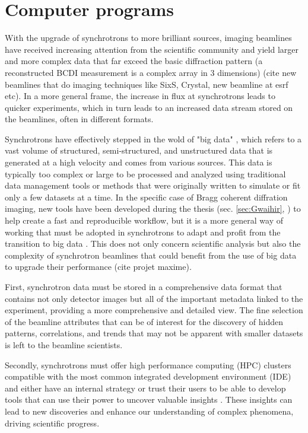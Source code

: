 \newpage
\section{Computer programs}

With the upgrade of synchrotrons to more brilliant sources, imaging beamlines have received increasing attention from the scientific community and yield larger and more complex data that far exceed the basic diffraction pattern (a reconstructed BCDI measurement is a complex array in 3 dimensions) (cite new beamlines that do imaging techniques like SixS, Crystal, new beamline at esrf etc).
In a more general frame, the increase in flux at synchrotrons leads to quicker experiments, which in turn leads to an increased data stream stored on the beamlines, often in different formats.

Synchrotrons have effectively stepped in the wold of "big data" \parencite{Alizada2017, Wang2018}, which refers to a vast volume of structured, semi-structured, and unstructured data that is generated at a high velocity and comes from various sources.
This data is typically too complex or large to be processed and analyzed using traditional data management tools or methods that were originally written to simulate or fit only a few datasets at a time.
In the specific case of Bragg coherent diffration imaging, new tools have been developed during the thesis (sec. \ref{sec:Gwaihir}, \cite{jerome_carnis_2021_5741935, Simonne2022}) to help create a fast and reproducible workflow, but it is a more general way of working that must be adopted in synchrotrons to adapt and profit from the transition to big data \parencite{Wang2018}.
This does not only concern scientific analysis but also the complexity of synchrotron beamlines that could benefit from the use of big data to upgrade their performance (cite projet maxime).

First, synchrotron data must be stored in a comprehensive data format \parencite{Konnecke2015} that contains not only detector images but all of the important metadata linked to the experiment, providing a more comprehensive and detailed view.
The fine selection of the beamline attributes that can be of interest for the discovery of hidden patterns, correlations, and trends that may not be apparent with smaller datasets is left to the beamline scientists.

Secondly, synchrotrons must offer high performance computing (HPC) clusters \parencite{Wang2021} compatible with the most common integrated development environment (IDE) and either have an internal strategy or trust their users to be able to develop tools that can use their power to uncover valuable insights \parencite{WangIEEE2016, Khaleghi2019}.
These insights can lead to new discoveries and enhance our understanding of complex phenomena, driving scientific progress.

